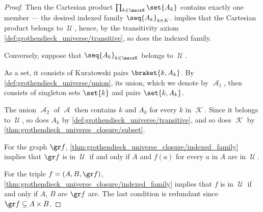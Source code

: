 \begin{proof}
  Then the Cartesian product \( \prod_{k \in \mscrK} \set{ A_k } \) contains exactly one member --- the desired indexed family \( \seq{ A_k }_{k \in K} \).  implies that the Cartesian product belongs to \( \mscrU \), hence, by the transitivity axiom \ref{def:grothendieck_universe/transitive}, so does the indexed family.

  \NecessitySubProof* Conversely, suppose that \( \seq{ A_k }_{k \in \mscrK} \) belongs to \( \mscrU \).

  As a set, it consists of Kuratowski pairs \( \braket{ k, A_k } \). By \ref{def:grothendieck_universe/union}, its union, which we denote by \( \mscrA_1 \), then consists of singleton sets \( \set{ k } \) and pairs \( \set{ k, A_k } \).

  The union \( \mscrA_2 \) of \( \mscrA \) then contains \( k \) and \( A_k \) for every \( k \) in \( \mscrK \). Since it belongs to \( \mscrU \), so does \( A_k \) by \ref{def:grothendieck_universe/transitive}, and so does \( \mscrK \) by \cref{thm:grothendieck_universe_closure/subset}.

   For the graph \( \gr f \), \cref{thm:grothendieck_universe_closure/indexed_family} implies that \( \gr f \) is in \( \mscrU \) if and only if \( A \) and \( f(a) \) for every \( a \) in \( A \) are in \( \mscrU \).

  For the triple \( f = (A, B, \gr f) \), \cref{thm:grothendieck_universe_closure/indexed_family} implies that \( f \) is in \( \mscrU \) if and only if \( A \), \( B \) are \( \gr f \) are. The last condition is redundant since \( \gr f \subseteq A \times B \).
\end{proof}

